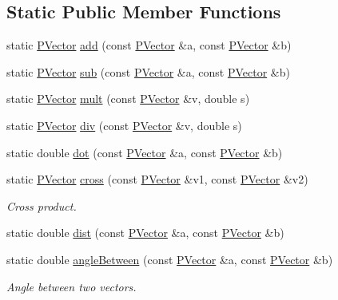 \subsection*{\-Static \-Public \-Member \-Functions}
\begin{DoxyCompactItemize}
\item 
static \hyperlink{classcprocessing_1_1PVector}{\-P\-Vector} \hyperlink{classcprocessing_1_1PVector_ad4ebf8a429965aa4a8c1f4d1ed8b7741}{add} (const \hyperlink{classcprocessing_1_1PVector}{\-P\-Vector} \&a, const \hyperlink{classcprocessing_1_1PVector}{\-P\-Vector} \&b)
\item 
static \hyperlink{classcprocessing_1_1PVector}{\-P\-Vector} \hyperlink{classcprocessing_1_1PVector_aa3c69b57eaa9e543acf8b7337e7a7fac}{sub} (const \hyperlink{classcprocessing_1_1PVector}{\-P\-Vector} \&a, const \hyperlink{classcprocessing_1_1PVector}{\-P\-Vector} \&b)
\item 
static \hyperlink{classcprocessing_1_1PVector}{\-P\-Vector} \hyperlink{classcprocessing_1_1PVector_a624022e09cbc418b621f11896ed3b85f}{mult} (const \hyperlink{classcprocessing_1_1PVector}{\-P\-Vector} \&v, double s)
\item 
static \hyperlink{classcprocessing_1_1PVector}{\-P\-Vector} \hyperlink{classcprocessing_1_1PVector_a3415b1002af5f0564156cebc01c2993d}{div} (const \hyperlink{classcprocessing_1_1PVector}{\-P\-Vector} \&v, double s)
\item 
static double \hyperlink{classcprocessing_1_1PVector_a4335d077d5d19354d9231dbe74b3d57a}{dot} (const \hyperlink{classcprocessing_1_1PVector}{\-P\-Vector} \&a, const \hyperlink{classcprocessing_1_1PVector}{\-P\-Vector} \&b)
\item 
static \hyperlink{classcprocessing_1_1PVector}{\-P\-Vector} \hyperlink{classcprocessing_1_1PVector_aadc8604a3750eff9bbf481646768a7c3}{cross} (const \hyperlink{classcprocessing_1_1PVector}{\-P\-Vector} \&v1, const \hyperlink{classcprocessing_1_1PVector}{\-P\-Vector} \&v2)
\begin{DoxyCompactList}\small\item\em \-Cross product. \end{DoxyCompactList}\item 
static double \hyperlink{classcprocessing_1_1PVector_a2a2368018222928ef230c47582fe1b8c}{dist} (const \hyperlink{classcprocessing_1_1PVector}{\-P\-Vector} \&a, const \hyperlink{classcprocessing_1_1PVector}{\-P\-Vector} \&b)
\item 
static double \hyperlink{classcprocessing_1_1PVector_a49b52fe0b002b3e0846d12edbc21a4b4}{angle\-Between} (const \hyperlink{classcprocessing_1_1PVector}{\-P\-Vector} \&a, const \hyperlink{classcprocessing_1_1PVector}{\-P\-Vector} \&b)
\begin{DoxyCompactList}\small\item\em \-Angle between two vectors. \end{DoxyCompactList}\end{DoxyCompactItemize}
